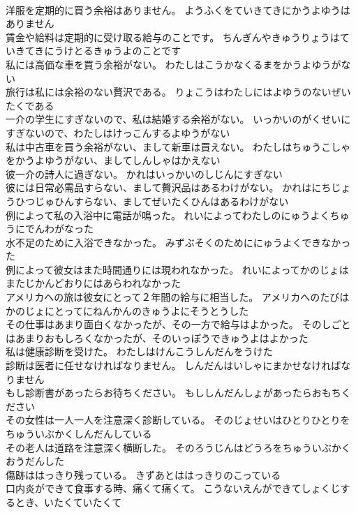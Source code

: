 \documentclass[8pt]{extreport}
\begin{document}
\begin{CJK}{UTF8}{min}
\\	洋服を定期的に買う余裕はありません。	ようふくをていきてきにかうよゆうはありません 
\\	賃金や給料は定期的に受け取る給与のことです。	ちんぎんやきゅうりょうはていきてきにうけとるきゅうよのことです 
\\	私には高価な車を買う余裕がない。	わたしはこうかなくるまをかうよゆうがない 
\\	旅行は私には余裕のない贅沢である。	りょこうはわたしにはよゆうのないぜいたくである 
\\	一介の学生にすぎないので、私は結婚する余裕がない。	いっかいのがくせいにすぎないので、わたしはけっこんするよゆうがない 
\\	私は中古車を買う余裕がない、まして新車は買えない。	わたしはちゅうこしゃをかうよゆうがない、ましてしんしゃはかえない 
\\	彼一介の詩人に過ぎない。	かれはいっかいのしじんにすぎない 
\\	彼には日常必需品すらない、まして贅沢品はあるわけがない。	かれはにちじょうひつじゅひんすらない、ましてぜいたくひんはあるわけがない 
\\	例によって私の入浴中に電話が鳴った。	れいによってわたしのにゅうよくちゅうにでんわがなった 
\\	水不足のために入浴できなかった。	みずぶそくのためににゅうよくできなかった 
\\	例によって彼女はまた時間通りには現われなかった。	れいによってかのじょはまたじかんどおりにはあらわれなかった 
\\	アメリカへの旅は彼女にとって２年間の給与に相当した。	アメリカへのたびはかのじょにとってにねんかんのきゅうよにそうとうした 
\\	その仕事はあまり面白くなかったが、その一方で給与はよかった。	そのしごとはあまりおもしろくなかったが、そのいっぽうできゅうよはよかった 
\\	私は健康診断を受けた。	わたしはけんこうしんだんをうけた 
\\	診断は医者に任せなければなりません。	しんだんはいしゃにまかせなければなりません 
\\	もし診断書があったらお待ちください。	もししんだんしょがあったらおもちください 
\\	その女性は一人一人を注意深く診断している。	そのじょせいはひとりひとりをちゅういぶかくしんだんしている 
\\	その老人は道路を注意深く横断した。	そのろうじんはどうろをちゅういぶかくおうだんした 
\\	傷跡ははっきり残っている。	きずあとははっきりのこっている 
\\	口内炎ができて食事する時、痛くて痛くて。	こうないえんができてしょくじするとき、いたくていたくて 

\end{CJK}
\end{document}

